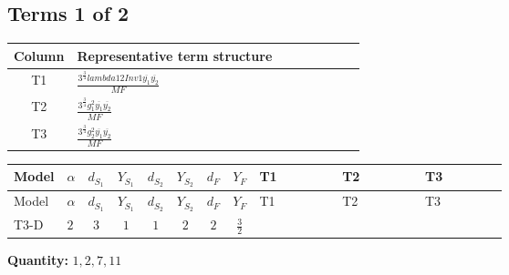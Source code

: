\documentclass[8pt]{article}
\begin{document}
\begin{landscape}
\subsection*{Terms 1 of 2}
\begin{center}
\begin{tabular}{@{}c >{\raggedright\arraybackslash}p{0.82\linewidth}@{}}
\toprule
Column & Representative term structure \\
\midrule
T1 & \(\displaystyle \frac{3^{\frac{3}{4}} lambda12Inv1 \overline{y_{1}} \overline{y_{2}}}{MF}\) \\
\midrule
T2 & \(\displaystyle \frac{3^{\frac{3}{4}} g_{1}^{2} \overline{y_{1}} \overline{y_{2}}}{MF}\) \\
\midrule
T3 & \(\displaystyle \frac{3^{\frac{3}{4}} g_{2}^{2} \overline{y_{1}} \overline{y_{2}}}{MF}\) \\
\midrule
\bottomrule
\end{tabular}
\end{center}
\smallskip
\tiny
\begin{longtable}{@{}llcccccc >{\raggedright\arraybackslash}p{0.21\linewidth} >{\raggedright\arraybackslash}p{0.21\linewidth} >{\raggedright\arraybackslash}p{0.21\linewidth}@{}}
\toprule
Model & $\alpha$ & $d_{S_1}$ & $Y_{S_1}$ & $d_{S_2}$ & $Y_{S_2}$ & $d_F$ & $Y_F$ & T1 & T2 & T3 \\
\midrule
\endfirsthead
\toprule
Model & $\alpha$ & $d_{S_1}$ & $Y_{S_1}$ & $d_{S_2}$ & $Y_{S_2}$ & $d_F$ & $Y_F$ & T1 & T2 & T3 \\
\midrule
\endhead
T3-D & $2$ & $3$ & $1$ & $1$ & $2$ & $2$ & $\frac{3}{2}$ & \scriptsize\adjustbox{max width=\linewidth}{$\begin{gathered} \frac{3^{\frac{3}{4}} lambda12Inv1 \overline{y_{1}} \overline{y_{2}}}{6 MF}\end{gathered}$} & \scriptsize\adjustbox{max width=\linewidth}{$\begin{gathered} \frac{9 \cdot 3^{\frac{3}{4}} g_{1}^{2} \overline{y_{1}} \overline{y_{2}}}{8 MF}\end{gathered}$} & \scriptsize\adjustbox{max width=\linewidth}{$\begin{gathered} \frac{25 \cdot 3^{\frac{3}{4}} g_{2}^{2} \overline{y_{1}} \overline{y_{2}}}{24 MF}\end{gathered}$} \\
\midrule
\bottomrule
\end{longtable}
\clearpage
\noindent\textbf{Quantity: }$\mathrm{1,2,7,11}$\par\smallskip

\end{landscape}
\end{document}
